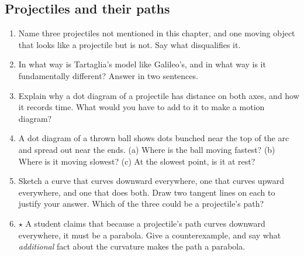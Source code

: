 \documentclass[11pt,twoside,openany]{book}
\begin{document}
\subsection*{Projectiles and their paths}
\begin{enumerate}[label=\textbf{\thechapter.\arabic*},series=exercises,leftmargin=*]
  \item Name three projectiles not mentioned in this chapter, and one moving object that looks like a projectile but is not. Say what disqualifies it.
  \item In what way is Tartaglia's model like Galileo's, and in what way is it fundamentally different? Answer in two sentences.
  \item Explain why a dot diagram of a projectile has distance on both axes, and how it records time. What would you have to add to it to make a motion diagram?
  \item A dot diagram of a thrown ball shows dots bunched near the top of the arc and spread out near the ends. (a) Where is the ball moving fastest? (b) Where is it moving slowest? (c) At the slowest point, is it at rest?
  \item Sketch a curve that curves downward everywhere, one that curves upward everywhere, and one that does both. Draw two tangent lines on each to justify your answer. Which of the three could be a projectile's path?
  \item $\star$ A student claims that because a projectile's path curves downward everywhere, it must be a parabola. Give a counterexample, and say what \emph{additional} fact about the curvature makes the path a parabola.
\end{enumerate}
\end{document}
